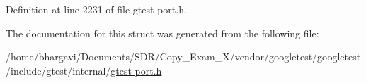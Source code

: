 Definition at line 2231 of file gtest-\/port.\+h.



The documentation for this struct was generated from the following file\+:\begin{DoxyCompactItemize}
\item 
/home/bhargavi/\+Documents/\+S\+D\+R/\+Copy\+\_\+\+Exam\+\_\+X/vendor/googletest/googletest/include/gtest/internal/\hyperlink{gtest-port_8h}{gtest-\/port.\+h}\end{DoxyCompactItemize}
